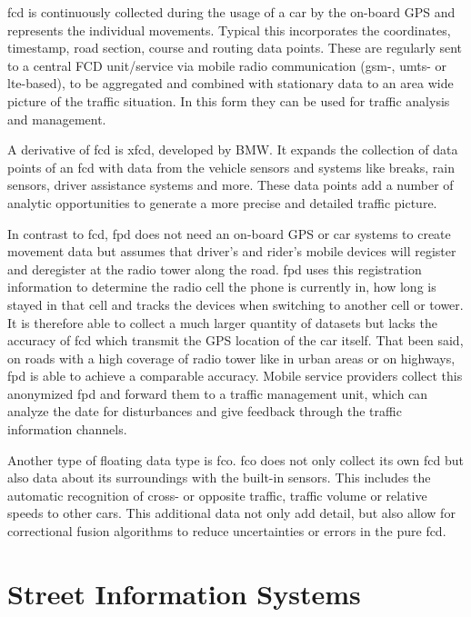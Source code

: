 \documentclass[a4paper,12pt]{report}
\begin{document}
\acrfull{fcd} is continuously collected during the usage of a car by the on-board GPS and represents the individual movements. Typical this incorporates the coordinates, timestamp, road section, course and routing data points. These are regularly sent to a central FCD unit/service via mobile radio communication (\acrshort{gsm}-, \acrshort{umts}- or \acrshort{lte}-based), to be aggregated and combined with stationary data to an area wide picture of the traffic situation. In this form they can be used for traffic analysis and management. \cite{Randelhoff2016,LAPID2020}

A derivative of \acrshort{fcd} is \acrfull{xfcd}, developed by BMW. It expands the collection of data points of an \acrshort{fcd} with data from the vehicle sensors and systems like breaks, rain sensors, driver assistance systems and more. These data points add a number of analytic opportunities to generate a more precise and detailed traffic picture. \cite{LAPID2020}

In contrast to \acrshort{fcd}, \acrlong{fpd} does not need an on-board GPS or car systems to create movement data but assumes that driver’s and rider’s mobile devices will register and deregister at the radio tower along the road. \acrshort{fpd} uses this registration information to determine the radio cell the phone is currently in, how long is stayed in that cell and tracks the devices when switching to another cell or tower. It is therefore able to collect a much larger quantity of datasets but lacks the accuracy of \acrshort{fcd} which transmit the GPS location of the car itself. That been said, on roads with a high coverage of radio tower like in urban areas or on highways, \acrshort{fpd} is able to achieve a comparable accuracy. Mobile service providers collect this anonymized \acrshort{fpd} and forward them to a traffic management unit, which can analyze the date for disturbances and give feedback through the traffic information channels. \cite{Randelhoff2016,LAPID2020}

Another type of floating data type is \acrfull{fco}. \acrshort{fco} does not only collect its own \acrshort{fcd} but also data about its surroundings with the built-in sensors. This includes the automatic recognition of cross- or opposite traffic, traffic volume or relative speeds to other cars. This additional data not only add detail, but also allow for correctional fusion algorithms to reduce uncertainties or errors in the pure \acrshort{fcd}. \cite{Randelhoff2016}

\section{Street Information Systems}
\end{document}
